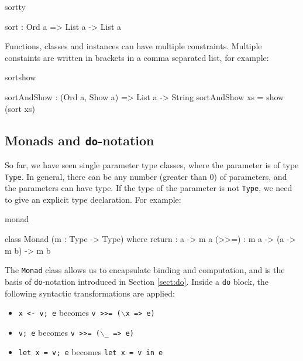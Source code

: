 \begin{SaveVerbatim}{sortty}

sort : Ord a => List a -> List a

\end{SaveVerbatim}

\noindent
Functions, classes and instances can have multiple constraints. Multiple constaints are
written in brackets in a comma separated list, for example:

\begin{SaveVerbatim}{sortshow}

sortAndShow : (Ord a, Show a) => List a -> String
sortAndShow xs = show (sort xs)

\end{SaveVerbatim}

\subsection{Monads and \texttt{do}-notation}

\label{sec:monad}

So far, we have seen single parameter type classes, where the parameter is of type
\texttt{Type}. In general, there can be any number (greater than 0) of parameters,
and the parameters can have  type.
If the type of the parameter is not \texttt{Type}, we need to give an explicit type
declaration. For example:

\begin{SaveVerbatim}{monad}

class Monad (m : Type -> Type) where
    return : a -> m a
    (>>=)  : m a -> (a -> m b) -> m b

\end{SaveVerbatim}

\noindent
The \texttt{Monad} class allows us to encapsulate binding and computation, and is the
basis of \texttt{do}-notation introduced in Section \ref{sect:do}. Inside a
\texttt{do} block, the following syntactic transformations are applied:

\begin{itemize}
\item \texttt{x <- v; e} becomes \texttt{v >>= ($\backslash$x => e)}
\item \texttt{v; e} becomes \texttt{v >>= ($\backslash$\_ => e)}
\item \texttt{let x = v; e} becomes \texttt{let x = v in e}
\end{itemize}

